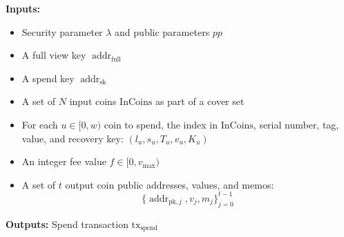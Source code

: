 \documentclass{llncs}
\newcommand{\addr}{\operatorname{addr}}
\begin{document}
\textbf{Inputs:}
\begin{itemize}
    \item Security parameter $\lambda$ and public parameters $pp$
    \item A full view key $\addr_{\text{full}}$
    \item A spend key $\addr_{\text{sk}}$
    \item A set of $N$ input coins $\text{InCoins}$ as part of a cover set
    \item For each $u \in [0,w)$ coin to spend, the index in $\text{InCoins}$, serial number, tag, value, and recovery key: $(l_u, s_u, T_u, v_u, K_u)$
    \item An integer fee value $f \in [0,v_{\text{max}})$
    \item A set of $t$ output coin public addresses, values, and memos: $$\{\addr_{\text{pk},j}, v_j, m_j\}_{j=0}^{t-1}$$
\end{itemize}

\textbf{Outputs:} Spend transaction $\text{tx}_{\text{spend}}$
\end{document}
